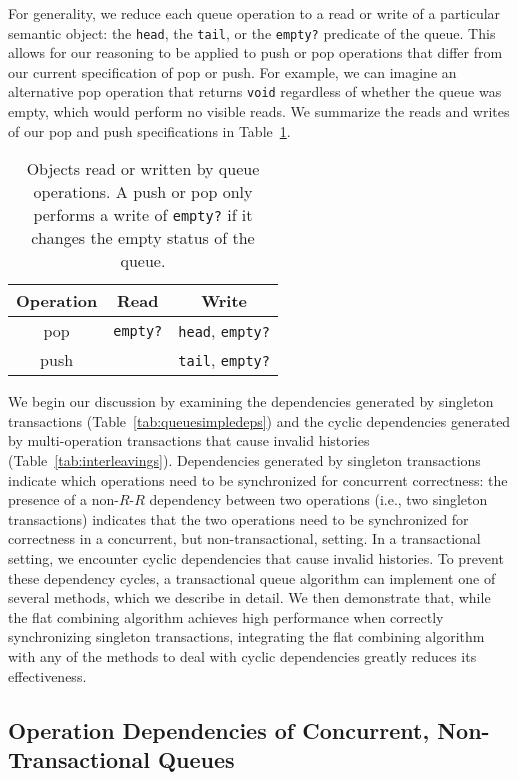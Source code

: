 For generality, we reduce each queue operation to a read or write of a particular semantic object: the \texttt{head}, the \texttt{tail}, or the \texttt{empty?} predicate of the queue. This allows for our reasoning to be applied to push or pop operations that differ from our current specification of pop or push. For example, we can imagine an alternative pop operation that returns \texttt{void} regardless of whether the queue was empty, which would perform no visible reads. We summarize the reads and writes of our pop and push specifications in Table~\ref{table:qrw}.

\begin{table}[t]
\centering
\begin{tabular}{c||c|c}
    Operation & Read & Write\\
    \hline
    pop & \texttt{empty?} & \texttt{head}, \texttt{empty?}\\
    push & & \texttt{tail}, \texttt{empty?}\\
\end{tabular}
    \caption[Objects read or written by queue operations]{Objects read or written by queue operations. A push or pop only performs a write of \texttt{empty?} if it changes the empty status of the queue.}
    \label{table:qrw}
\end{table}

We begin our discussion by examining the dependencies generated by singleton transactions (Table~\ref{tab:queuesimpledeps}) and the cyclic dependencies generated by multi-operation transactions that cause invalid histories (Table~\ref{tab:interleavings}). 
Dependencies generated by singleton transactions indicate which operations need to be synchronized for concurrent correctness: the presence of a non-$R$-$R$ dependency between two operations (i.e., two singleton transactions) indicates that the two operations need to be synchronized for correctness in a concurrent, but non-transactional, setting.
In a transactional setting, we encounter cyclic dependencies that cause invalid histories. To prevent these dependency cycles, a transactional queue algorithm can implement one of several methods, which we describe in detail.
We then demonstrate that, while the flat combining algorithm achieves high performance when correctly synchronizing singleton transactions, integrating the flat combining algorithm with any of the methods to deal with cyclic dependencies greatly reduces its effectiveness.

\subsection{Operation Dependencies of Concurrent, Non-Transactional Queues}

